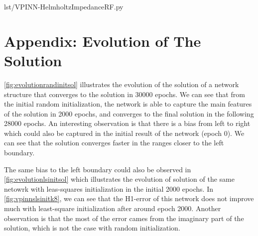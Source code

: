 
{lst/VPINN-HelmholtzImpedanceRF.py}

\section{Appendix: Evolution of The Solution} \label{app:evolutions}
\autoref{fig:evolutionrandinitsol} illustrates the evolution of the solution of a network structure that converges to the solution in 30000 epochs. We can see that from the initial random initialization, the network is able to capture the main features of the solution in 2000 epochs, and converges to the final solution in the following 28000 epochs. An interesting observation is that there is a bias from left to right which could also be captured in the initial result of the network (epoch 0). We can see that the solution converges faster in the ranges closer to the left boundary.

The same bias to the left boundary could also be observed in \autoref{fig:evolutionlsinitsol} which illustrates the evolution of solution of the same netowrk with leas-squares initialization in the initial 2000 epochs. In \autoref{fig:vpinnslsinitk8}, we can see that the H1-error of this network does not improve much with least-square initialization after around epoch 2000. Another observation is that the most of the error cames from the imaginary part of the solution, which is not the case with random initialization.

